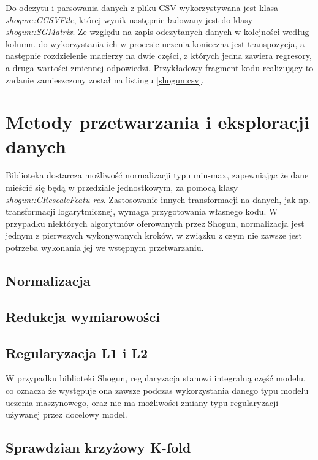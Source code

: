 Do odczytu i parsowania danych z pliku CSV wykorzystywana jest klasa \textit{shogun::CCSVFile}, której wynik następnie ładowany jest do klasy \textit{shogun::SGMatrix}. Ze względu na zapis odczytanych danych w kolejności według kolumn. do wykorzystania ich w procesie uczenia konieczna jest transpozycja, a następnie rozdzielenie macierzy na dwie części, z których jedna zawiera regresory, a druga wartości zmiennej odpowiedzi. Przykładowy fragment kodu realizujący to zadanie zamieszczony został na listingu \ref{shogun:csv}.


\section{Metody przetwarzania i eksploracji danych}
     
Biblioteka dostarcza możliwość normalizacji typu min-max, zapewniając że dane mieścić się będą w przedziale jednostkowym, za pomocą klasy \textit{shogun::CRescaleFeatu-res}. Zastosowanie innych transformacji na danych, jak np. transformacji logarytmicznej, wymaga przygotowania własnego kodu. W przypadku niektórych algorytmów oferowanych przez Shogun, normalizacja jest jednym z pierwszych wykonywanych kroków, w związku z czym nie zawsze jest potrzeba wykonania jej we wstępnym przetwarzaniu.

\subsection{Normalizacja}
\subsection{Redukcja wymiarowości}
\subsection{Regularyzacja L1 i L2}

W przypadku biblioteki Shogun, regularyzacja stanowi integralną część modelu, co oznacza że występuje ona zawsze podczas wykorzystania danego typu modelu uczenia maszynowego, oraz nie ma możliwości zmiany typu regularyzacji używanej przez docelowy model.

\subsection{Sprawdzian krzyżowy K-fold}

